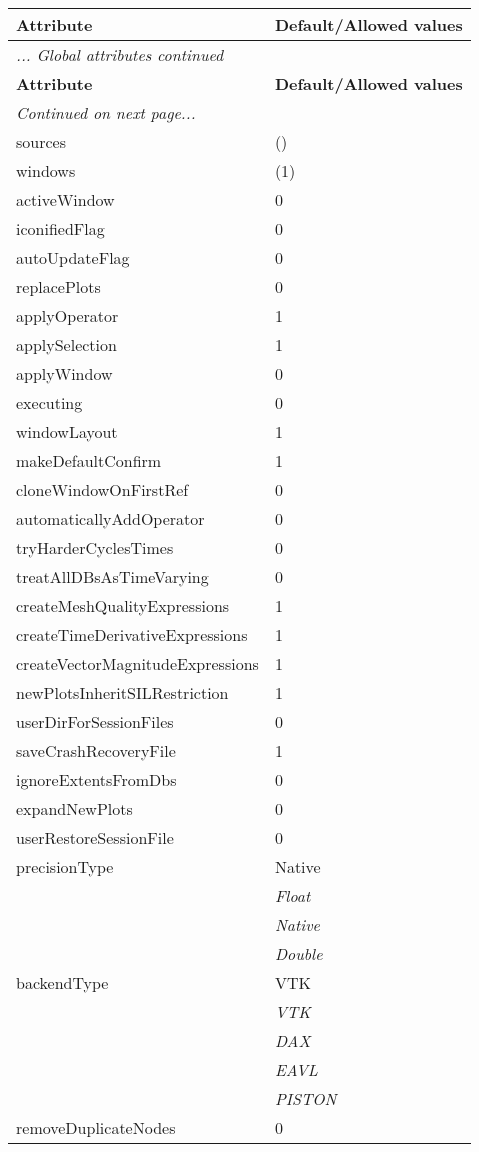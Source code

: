 \documentclass[10pt,a4paper]{report}
\begin{document}
\begin{longtable}{ll}
{\bf Attribute} & {\bf Default/Allowed values} \\
\hline \hline
\endfirsthead
\multicolumn{2}{l}{{\it ... Global attributes continued}} \\
{\bf Attribute} & {\bf Default/Allowed values} \\
\hline \hline
\endhead
\hline
\multicolumn{2}{l}{{\it Continued on next page...}} \\
\endfoot
\hline
\endlastfoot

sources  &  () \\
windows  &  (1) \\
activeWindow  &  0 \\
iconifiedFlag  &  0 \\
autoUpdateFlag  &  0 \\
replacePlots  &  0 \\
applyOperator  &  1 \\
applySelection  &  1 \\
applyWindow  &  0 \\
executing  &  0 \\
windowLayout  &  1 \\
makeDefaultConfirm  &  1 \\
cloneWindowOnFirstRef  &  0 \\
automaticallyAddOperator  &  0 \\
tryHarderCyclesTimes  &  0 \\
treatAllDBsAsTimeVarying  &  0 \\
createMeshQualityExpressions  &  1 \\
createTimeDerivativeExpressions  &  1 \\
createVectorMagnitudeExpressions  &  1 \\
newPlotsInheritSILRestriction  &  1 \\
userDirForSessionFiles  &  0 \\
saveCrashRecoveryFile  &  1 \\
ignoreExtentsFromDbs  &  0 \\
expandNewPlots  &  0 \\
userRestoreSessionFile  &  0 \\
precisionType  &  Native   \\
 & {\it  Float} \\
 & {\it  Native} \\
 & {\it  Double} \\
backendType  &  VTK   \\
 & {\it  VTK} \\
 & {\it  DAX} \\
 & {\it  EAVL} \\
 & {\it  PISTON} \\
removeDuplicateNodes  &  0 \\
\end{longtable}
\end{document}
